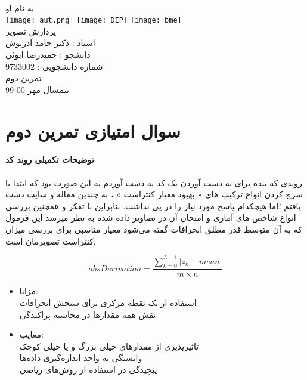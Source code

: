 \documentclass[12pt]{article}
\begin{document}
	\doublespacing
	\begin{titlepage}
		\paragraph*{}
		\centering
			
			
			{\small به نام او}\\
			\vspace{1cm}
			\texttt{[image: aut.png]}
			\hspace{1cm}
			\texttt{[image: DIP]}
			\hspace{1cm}
			\texttt{[image: bme]}\\
			\vspace{2cm}
			{\Huge پردازش تصویر}\\
			\vspace{2cm}
			{\large استاد : دکتر حامد آذرنوش}\\
			\vspace{0.5cm}
			{\small  دانشجو :‌ حمیدرضا ابوئی}\\
			\vspace{0.5cm}
			{\small شماره دانشجویی : 9733002}\\
			\vspace{0.5cm}
			{\small تمرین دوم}\\
			\vfill
			{\tiny نیمسال مهر 00-99}
	\end{titlepage}
	\thispagestyle{plain}
	\newpage
	\doublespacing
	\section*{سوال امتیازی تمرین دوم}
		\paragraph{توضیحات تکمیلی روند کد}
		روندی که بنده برای به دست آوردن یک کد به دست آوردم به این صورت بود که ابتدا با سرچ کردن انواع ترکیب های « بهبود معیار کنتراست » ، به چندین مقاله و سایت دست یافتم ؛اما هیچکدام ‍پاسخ مورد نیاز را در پی نداشت. بنابراین با تفکر و همچنین بررسی انواع شاخص های آماری و امتحان آن در تصاویر داده شده به نظر میرسد این فرمول که به آن متوسط قدر مطلق انحرافات گفته می‌شود معیار مناسبی برای بررسی میزان کنتراست تصویرمان است.
		
		\begin{equation}
		\label{eq1}
			absDerivation =\frac{ \sum\limits_{k=0}^{L-1} |z_k-mean|}{m\times n}
		\end{equation} 
		\begin{itemize}
			\item
		مزایا:\\
		استفاده از یک نقطه‌ مرکزی برای سنجش انحرافات\\
		نقش همه مقدارها در محاسبه پراکندگی\\
		\item
		معایب:\\
		تاثیرپذیری از مقدارهای خیلی بزرگ و یا خیلی کوچک\\
		وابستگی به واحد اندازه‌گیری داده‌ها\\
		پیچیدگی در استفاده از روش‌های ریاضی\\
		
		\end{itemize}
\end{document}

